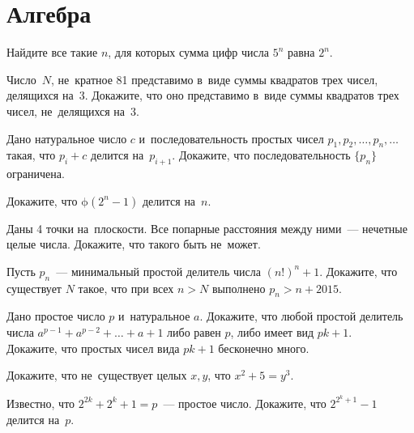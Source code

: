 

\section*{Алгебра}


\begingroup
    \ifx\mathup\undefined
        \def\eulerphi{\upphi}
    \else
        \def\eulerphi{\mathrm{\phi}}
    \fi

\begin{problems}

\item
Найдите все такие $n$, для которых сумма цифр числа $5^n$ равна $2^n$.

\item
Число~$N$, не~кратное 81 представимо в~виде суммы квадратов трех чисел,
делящихся на~3.
Докажите, что оно представимо в~виде суммы квадратов трех чисел, не~делящихся
на~3.

\item
Дано натуральное число $c$ и~последовательность простых чисел
$p_1, p_2, \ldots, p_n, \ldots$ такая, что $p_i + c$ делится на~$p_{i+1}$.
Докажите, что последовательность $\{p_n\}$ ограничена.

\item
Докажите, что $\eulerphi(2^n - 1)$ делится на~$n$.

\item
Даны 4 точки на~плоскости.
Все попарные расстояния между ними~--- нечетные целые числа.
Докажите, что такого быть не~может.

\item
Пусть $p_n$~--- минимальный простой делитель числа $(n!)^n + 1$.
Докажите, что существует $N$ такое, что при всех $n > N$ выполнено
$p_n > n + 2015$.

\item
\subproblem
Дано простое число $p$ и~натуральное $a$.
Докажите, что любой простой делитель числа $a^{p-1} + a^{p-2} + \ldots + a + 1$
либо равен $p$, либо имеет вид $p k + 1$.
\\
\subproblem
Докажите, что простых чисел вида $p k + 1$ бесконечно много.

\item
Докажите, что не~существует целых $x, y$, что $x^2 + 5 = y^3$.

\item
Известно, что $2^{2k} + 2^k + 1 = p$~--- простое число.
Докажите, что $2^{2^k+1} - 1$ делится на~$p$.

\end{problems}

\endgroup %

